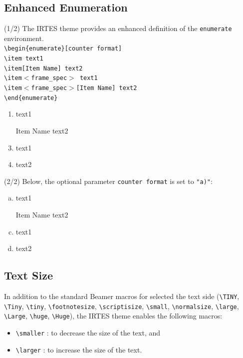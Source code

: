 \documentclass[english,circlenumberstyle]{irtesbeamer}
\begin{document}
\subsection{Enhanced Enumeration}
\begin{frame}{\subsecname (1/2)}
	The IRTES theme provides an enhanced definition of the \texttt{enumerate} environment. \\[.5cm]
	{\smaller
	\texttt{{\textbackslash}begin\{enumerate\}[counter format]} \\
	\texttt{{\textbackslash}item text1} \\
	\texttt{{\textbackslash}item[Item Name] text2} \\
	\texttt{{\textbackslash}item$<$frame\_spec$>$ text1} \\
	\texttt{{\textbackslash}item$<$frame\_spec$>$[Item Name] text2} \\
	\texttt{{\textbackslash}end\{enumerate\}}} \\[.5cm]
	\begin{enumerate}
	\item text1
	\item[Item Name] text2
	\item<2> text1
	\item<2>[Item Name] text2
	\end{enumerate}
\end{frame}

\begin{frame}{\subsecname (2/2)}
	Below, the optional parameter \texttt{counter format} is set to \texttt{"a)"}: \\[.5cm]
	\begin{enumerate}[a)]
	\item text1
	\item[Item Name] text2
	\item<2> text1
	\item<2>[Item Name] text2
	\end{enumerate}
\end{frame}

\subsection{Text Size}

\begin{frame}{\subsecname}
	In addition to the standard Beamer macros for selected the text side (\texttt{{\textbackslash}TINY}, \texttt{{\textbackslash}Tiny}, \texttt{{\textbackslash}tiny}, \texttt{{\textbackslash}footnotesize}, \texttt{{\textbackslash}scriptisize}, \texttt{{\textbackslash}small}, \texttt{{\textbackslash}normalsize}, \texttt{{\textbackslash}large}, \texttt{{\textbackslash}Large}, \texttt{{\textbackslash}huge}, \texttt{{\textbackslash}Huge}), the IRTES theme enables the following macros:
	\begin{itemize}
	\item \texttt{{\textbackslash}smaller} : to decrease the size of the text, and
	\item \texttt{{\textbackslash}larger} : to increase the size of the text.
	\end{itemize}
\end{frame}
\makeatother
\end{document}
